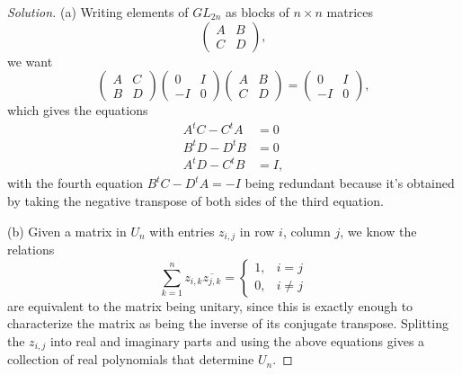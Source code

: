 \documentclass[11pt]{scrartcl}
\providecommand{\ol}{\overline}
\newenvironment{soln}{\begin{proof}[Solution]}{\end{proof}}
\begin{document}
\begin{soln}
	(a) Writing elements of $GL_{2n}$ as blocks of $n\times n$ matrices
	\[\begin{pmatrix}
		A&B\\C&D
	\end{pmatrix},\]
	we want
	\[\begin{pmatrix}
		A&C\\B&D
	\end{pmatrix}
	\begin{pmatrix}
		0&I\\-I&0
	\end{pmatrix}
	\begin{pmatrix}
		A&B\\C&D
	\end{pmatrix} =
	\begin{pmatrix}
		0&I\\-I&0
	\end{pmatrix},\]
	which gives the equations
	\begin{align*}
		A^tC - C^tA &= 0\\
		B^tD - D^tB &= 0\\
		A^tD - C^tB &= I,
	\end{align*}
	with the fourth equation $B^tC - D^tA = -I$ being redundant
	because it's obtained by taking the negative transpose
	of both sides of the third equation.
	
	(b) Given a matrix in $U_n$ with entries $z_{i,j}$ in row $i$, column $j$,
	we know the relations
	\[\sum_{k=1}^n z_{i,k}\ol{z_{j,k}} =\begin{cases}
		1, & i=j\\
		0, & i\ne j
	\end{cases}\]
	are equivalent to the matrix being unitary, since
	this is exactly enough to characterize the matrix as being the inverse
	of its conjugate transpose.
	Splitting the $z_{i,j}$ into real and imaginary parts
	and using the above equations gives a collection of
	real polynomials that determine $U_n$.
\end{soln}
\end{document}
